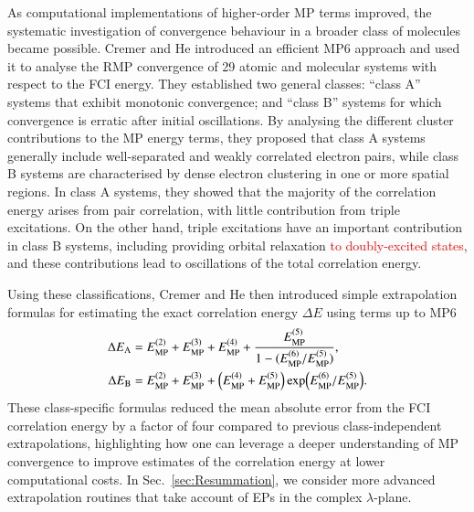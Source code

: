 \documentclass[aps,prb,reprint,noshowkeys,superscriptaddress]{revtex4-1}
\newcommand{\titou}[1]{\textcolor{red}{#1}}
\newcommand{\Emp}{E_{\text{MP}}}
\begin{document}
As computational implementations of higher-order MP terms improved, the systematic investigation 
of convergence behaviour in a broader class of molecules became possible.
Cremer and He introduced an efficient MP6 approach and used it to analyse the RMP convergence of
29 atomic and molecular systems with respect to the FCI energy.\cite{Cremer_1996}
They established two general classes: ``class A'' systems that exhibit monotonic convergence; 
and ``class B'' systems for which convergence is erratic after initial oscillations. 
By analysing the different cluster contributions to the MP energy terms, they proposed that
class A systems generally include well-separated and weakly correlated electron pairs, while class B systems
are characterised by dense electron clustering in one or more spatial regions.\cite{Cremer_1996}
In class A systems, they showed that the majority of the correlation energy arises from pair correlation, 
with little contribution from triple excitations.
On the other hand, triple excitations have an important contribution in class B systems, including providing
orbital relaxation \titou{to doubly-excited states}, and these contributions lead to oscillations of the total correlation energy.

Using these classifications, Cremer and He then introduced simple extrapolation formulas for estimating the 
exact correlation energy $\Delta E$ using terms up to MP6\cite{Cremer_1996}
\begin{subequations}
\begin{align}
	\label{eq:CrHeA}
\Delta E_{\text{A}}
    &= \Emp^{(2)} + \Emp^{(3)} + \Emp^{(4)}
     + \frac{\Emp^{(5)}}{1 - (\Emp^{(6)} / \Emp^{(5)})}, 
     \\
	\label{eq:CrHeB}
\Delta E_{\text{B}} 
    &= \Emp^{(2)} + \Emp^{(3)} + \qty(\Emp^{(4)} + \Emp^{(5)}) \exp(\Emp^{(6)} / \Emp^{(5)}).
\end{align}
\end{subequations}
These class-specific formulas reduced the mean absolute error from the FCI correlation energy by a
factor of four compared to previous class-independent extrapolations,
highlighting how one can leverage a deeper understanding of MP convergence to improve estimates of 
the correlation energy at lower computational costs. 
In Sec.~\ref{sec:Resummation}, we consider more advanced extrapolation routines that take account of EPs in the complex $\lambda$-plane.
\end{document}
